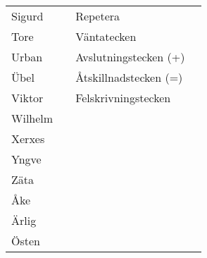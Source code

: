 \begin{tabular}{llll}
	Sigurd  & \MSigurd  & Repetera              & \MRepetera     \\
	Tore    & \MTore    & Väntatecken           & \MVanta        \\
	Urban   & \MUrban   & Avslutningstecken (+) & \MAvslutning   \\
	Übel    & \MUbel    & Åtskillnadstecken (=) & \MAtskillnad   \\
	Viktor  & \MViktor  & Felskrivningstecken   & \MFelskrivning \\
	Wilhelm & \MWilhelm &                       &  \\
	Xerxes  & \MXerxes  &                       &  \\
	Yngve   & \MYngve   &                       &  \\
	Zäta    & \MZata    &                       &  \\
	Åke     & \MAke     &                       &  \\
	Ärlig   & \MArlig   &                       &  \\
	Östen   & \MOsten   &
\end{tabular}


